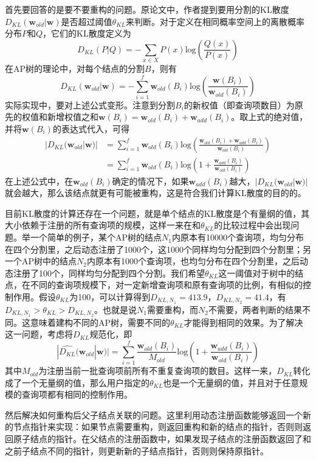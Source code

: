 \documentclass[UTF8]{ctexart}
\begin{document}
首先要回答的是要不要重构的问题。原论文中，作者提到要用分割的KL散度$D_{KL}(\textbf{w}_{old}|\textbf{w})$是否超过阈值$\theta_{KL}$来判断。对于定义在相同概率空间上的离散概率分布$P$和$Q$，它们的KL散度定义为
\[D_{KL}(P|Q)=-\sum_{x\in X} P(x)\mathrm{log}(\frac{Q(x)}{P(x)})\]
在AP树的理论中，对每个结点的分割$B$，则有
\[D_{KL}(\textbf{w}_{old}|\textbf{w})=-\sum_{i=1}^f \textbf{w}_{old}(B_i) \mathrm{log}(\frac{\textbf{w}(B_i)}{\textbf{w}_{old}(B_i)})\]
实际实现中，要对上述公式变形。注意到分割$B_i$的新权值（即查询项数目）为原先的权值和新增权值之和$\textbf{w}(B_i)=\textbf{w}_{old}(B_i)+\textbf{w}_{add}(B_i)$。取上式的绝对值，并将$\textbf{w}(B_i)$的表达式代入，可得 
\[\begin{split}|D_{KL}(\textbf{w}_{old}|\textbf{w})| 
&= \sum_{i=1}^f \textbf{w}_{old}(B_i) \mathrm{log}(\frac{\textbf{w}_{old}(B_i) + \textbf{w}_{add}(B_i)}{\textbf{w}_{old}(B_i)}) \\
&= \sum_{i=1}^f \textbf{w}_{old}(B_i)\mathrm{log}(1 + \frac{\textbf{w}_{add}(B_i)}{\textbf{w}_{old}(B_i)}) \end{split}\] 
在上述公式中，在$\textbf{w}_{old}(B_i)$确定的情况下，如果$\textbf{w}_{add}(B_i)$越大，$|D_{KL}(\textbf{w}_{old}|\textbf{w})|$就会越大，那么该结点就更有可能被重构，这是符合我们计算KL散度的目的的。

目前KL散度的计算还存在一个问题，就是单个结点的KL散度是个有量纲的值，其大小依赖于注册的所有查询项的规模，这样一来在和$\theta_{KL}$的比较过程中会出现问题。举一个简单的例子，某个AP树的结点$N_1$内原本有10000个查询项，均匀分布在四个分割里，之后动态注册了1000个，这1000个同样均匀分配到四个分割里；另一个AP树中的结点$N_2$内原本有1000个查询项，也均匀分布在四个分割里，之后动态注册了100个，同样均匀分配到四个分割。我们希望$\theta_{KL}$这一阈值对于树中的结点，在不同的查询项规模下，对一定新增查询项和原有查询项的比例，有相似的控制作用。假设$\theta_{KL}$为100，可以计算得到$D_{KL,N_1}=413.9$，$D_{KL,N_2}=41.4$，有$D_{KL,N_1} > \theta_{KL} > D_{KL,N_2}$。也就是说$N_1$需要重构，而$N_2$不需要，两者判断的结果不同。这意味着建构不同的AP树，需要不同的$\theta_{KL}$才能得到相同的效果。为了解决这一问题，考虑将$D_{KL}$规范化，即
\[|\widehat{D_{KL}}(\textbf{w}_{old}|\textbf{w})| = \sum_{i=1}^f \frac{\textbf{w}_{old}(B_i)}{M_{old}}\mathrm{log}(1 + \frac{\textbf{w}_{add}(B_i)}{\textbf{w}_{old}(B_i)})\]
其中$M_{old}$为注册当前一批查询项前所有不重复查询项的数目。这样一来，$D_{KL}$转化成了一个无量纲的值，那么用户指定的$\theta_{KL}$也是一个无量纲的值，并且对于任意规模的查询项都有相同的控制作用。

然后解决如何重构后父子结点关联的问题。这里利用动态注册函数能够返回一个新的节点指针来实现：如果节点需要重构，则返回重构和新的结点的指针，否则则返回原子结点的指针。在父结点的注册函数中，如果发现子结点的注册函数返回了和之前子结点不同的指针，则更新新的子结点指针，否则则保持原指针。
\end{document}
